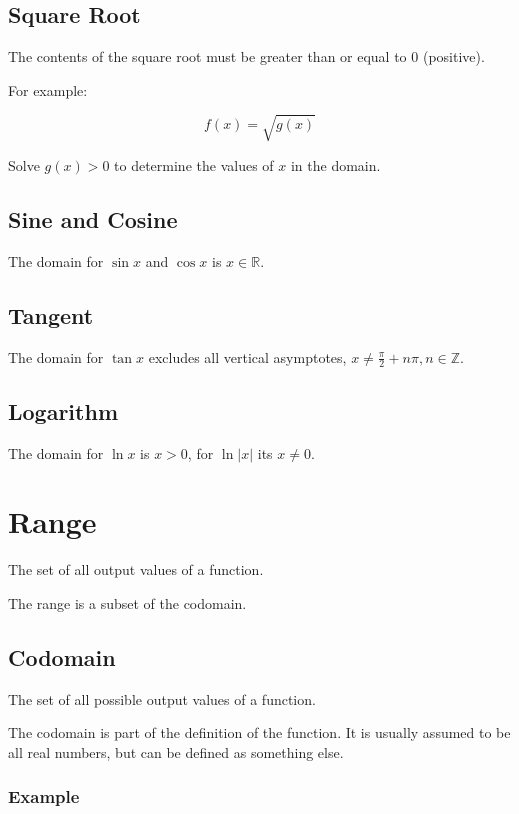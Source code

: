 \documentclass[a4paper,11pt]{report}
\begin{document}
\subsection{Square Root}

The contents of the square root must be greater than or equal to 0 (positive).

For example:

$$
f(x) = \sqrt{g(x)}
$$

Solve $g(x) > 0$ to determine the values of $x$ in the domain.

\subsection{Sine and Cosine}

The domain for $\sin{x}$ and $\cos{x}$ is $x \in \mathbb{R}$.

\subsection{Tangent}

The domain for $\tan{x}$ excludes all vertical asymptotes,
$x \neq \frac{\pi}{2} + n\pi, n \in \mathbb{Z}$.

\subsection{Logarithm}

The domain for $\ln{x}$ is $x > 0$, for $\ln{|x|}$ its $x \neq 0$.


\section{Range}

The set of all output values of a function.

The range is a subset of the codomain.

\subsection{Codomain}

The set of all possible output values of a function.

The codomain is part of the definition of the function. It is usually assumed
to be all real numbers, but can be defined as something else.

\subsubsection{Example}
\end{document}
